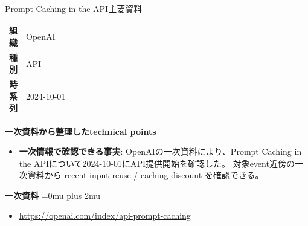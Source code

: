 \begin{technicalnote}{Prompt Caching in the API}{主要資料}
\begingroup
\begin{tabularx}{\linewidth}{@{}>{\bfseries}p{0.22\linewidth}X@{}}
組織 & OpenAI \\
種別 & API \\
時系列 & 2024-10-01 \\
\end{tabularx}
\smallskip
{\bfseries 一次資料から整理したtechnical points}
\begin{itemize}[leftmargin=1.5em,itemsep=0.35em]
\item \textbf{一次情報で確認できる事実}: OpenAIの一次資料により、Prompt Caching in the APIについて2024-10-01にAPI提供開始を確認した。 対象event近傍の一次資料から recent-input reuse / caching discount を確認できる。
\end{itemize}
\begin{minipage}{\linewidth}
\begin{samepage}
{\bfseries 一次資料}
\begingroup\sloppy
\Urlmuskip=0mu plus 2mu\relax
\begin{itemize}[leftmargin=1.5em,itemsep=0.25em]
\item {\scriptsize\url{https://openai.com/index/api-prompt-caching}}
\end{itemize}
\endgroup
\end{samepage}
\end{minipage}
\endgroup
\end{technicalnote}
\medskip

